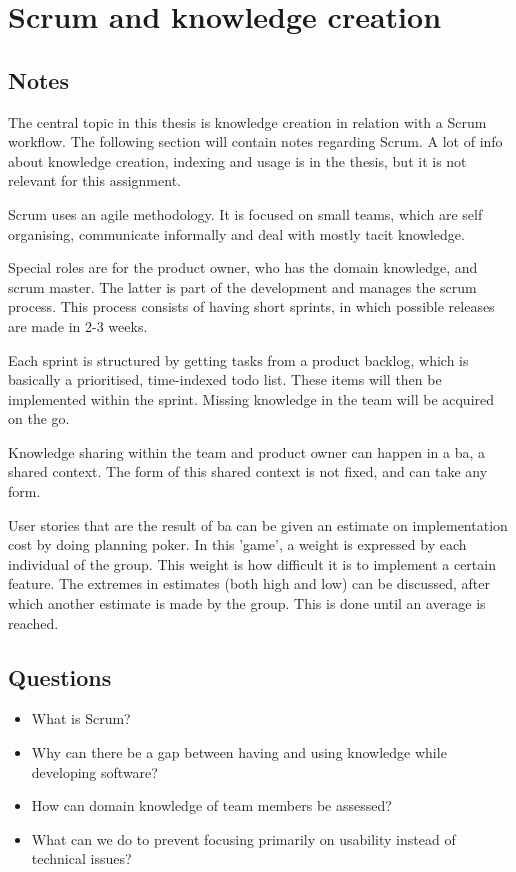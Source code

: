 \chapter{Scrum and knowledge creation \cite{van2012scrum}}
\section{Notes}
The central topic in this thesis is knowledge creation in relation with a Scrum workflow.
The following section will contain notes regarding Scrum.
A lot of info about knowledge creation, indexing and usage is in the thesis, but it is not relevant for this assignment.

Scrum uses an agile methodology. 
It is focused on small teams, which are self organising, communicate informally and deal with mostly tacit knowledge. 

Special roles are for the product owner, who has the domain knowledge, and scrum master. 
The latter is part of the development and manages the scrum process.
This process consists of having short sprints, in which possible releases are made in 2-3 weeks. 

Each sprint is structured by getting tasks from a product backlog, which is basically a prioritised, time-indexed todo list. 
These items will then be implemented within the sprint.
Missing knowledge in the team will be acquired on the go. 

Knowledge sharing within the team and product owner can happen in a ba, a shared context.
The form of this shared context is not fixed, and can take any form.

User stories that are the result of ba can be given an estimate on implementation cost by doing planning poker.
In this 'game', a weight is expressed by each individual of the group.
This weight is how difficult it is to implement a certain feature. 
The extremes in estimates (both high and low) can be discussed, after which another estimate is made by the group. 
This is done until an average is reached. 


\section{Questions}
\begin{itemize}
  \item What is Scrum?
  \item Why can there be a gap between having and using knowledge while developing software?
  \item How can domain knowledge of team members be assessed?
  \item What can we do to prevent focusing primarily on usability instead of technical issues?
\end{itemize}
